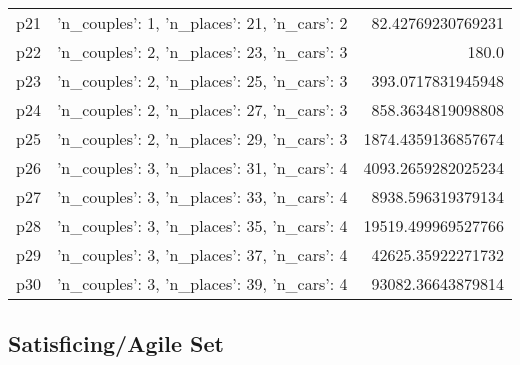 \documentclass{article}
\begin{document}
\begin{center}
\begin{tabular}{r|r|r}
  p21&{'n\_couples': 1, 'n\_places': 21, 'n\_cars': 2}&82.42769230769231\\
  p22&{'n\_couples': 2, 'n\_places': 23, 'n\_cars': 3}&180.0\\
  p23&{'n\_couples': 2, 'n\_places': 25, 'n\_cars': 3}&393.0717831945948\\
  p24&{'n\_couples': 2, 'n\_places': 27, 'n\_cars': 3}&858.3634819098808\\
  p25&{'n\_couples': 2, 'n\_places': 29, 'n\_cars': 3}&1874.4359136857674\\
  p26&{'n\_couples': 3, 'n\_places': 31, 'n\_cars': 4}&4093.2659282025234\\
  p27&{'n\_couples': 3, 'n\_places': 33, 'n\_cars': 4}&8938.596319379134\\
  p28&{'n\_couples': 3, 'n\_places': 35, 'n\_cars': 4}&19519.499969527766\\
  p29&{'n\_couples': 3, 'n\_places': 37, 'n\_cars': 4}&42625.35922271732\\
  p30&{'n\_couples': 3, 'n\_places': 39, 'n\_cars': 4}&93082.36643879814
                            \end{tabular}
                            \end{center}
                    

                                \subsection*{Satisficing/Agile Set}
                                
\end{document}
